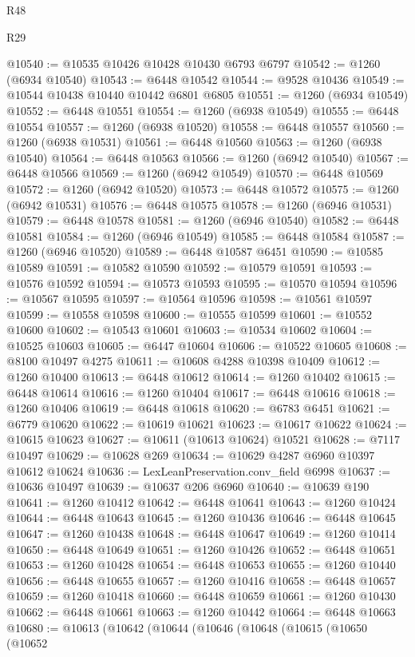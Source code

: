 \begin{lexlean}{R48}
\begin{lexlean}{R29}
\begin{coremodule}
{{{{{{{{{{{{{{{{{{{{{{{{{{{{{{{{{{{{{{{{{{{{{{{{{{{{{{{{{{{{{{{{{{{{{{{{{{{{{{{{{{{{{{{{{{{{{{{{{{{{{{{{{{{{{{{{{{{{{{{{{{{{{{{{{{{{{{{{{{{{{{{{{{{{{{{{{{{{{{{{{{{{{{{{{{{{{{{{{{{{{{{{{{{{{{{{{{{{{{{{{{{{{{{{{{{{{{{{{{@10540 := @10535 @10426 @10428 @10430 @6793 @6797
@10542 := @1260 (@6934 @10540)
@10543 := @6448 @10542
@10544 := @9528 @10436
@10549 := @10544 @10438 @10440 @10442 @6801 @6805
@10551 := @1260 (@6934 @10549)
@10552 := @6448 @10551
@10554 := @1260 (@6938 @10549)
@10555 := @6448 @10554
@10557 := @1260 (@6938 @10520)
@10558 := @6448 @10557
@10560 := @1260 (@6938 @10531)
@10561 := @6448 @10560
@10563 := @1260 (@6938 @10540)
@10564 := @6448 @10563
@10566 := @1260 (@6942 @10540)
@10567 := @6448 @10566
@10569 := @1260 (@6942 @10549)
@10570 := @6448 @10569
@10572 := @1260 (@6942 @10520)
@10573 := @6448 @10572
@10575 := @1260 (@6942 @10531)
@10576 := @6448 @10575
@10578 := @1260 (@6946 @10531)
@10579 := @6448 @10578
@10581 := @1260 (@6946 @10540)
@10582 := @6448 @10581
@10584 := @1260 (@6946 @10549)
@10585 := @6448 @10584
@10587 := @1260 (@6946 @10520)
@10589 := @6448 @10587 @6451
@10590 := @10585 @10589
@10591 := @10582 @10590
@10592 := @10579 @10591
@10593 := @10576 @10592
@10594 := @10573 @10593
@10595 := @10570 @10594
@10596 := @10567 @10595
@10597 := @10564 @10596
@10598 := @10561 @10597
@10599 := @10558 @10598
@10600 := @10555 @10599
@10601 := @10552 @10600
@10602 := @10543 @10601
@10603 := @10534 @10602
@10604 := @10525 @10603
@10605 := @6447 @10604
@10606 := @10522 @10605
@10608 := @8100 @10497 @4275
@10611 := @10608 @4288 @10398 @10409
@10612 := @1260 @10400
@10613 := @6448 @10612
@10614 := @1260 @10402
@10615 := @6448 @10614
@10616 := @1260 @10404
@10617 := @6448 @10616
@10618 := @1260 @10406
@10619 := @6448 @10618
@10620 := @6783 @6451
@10621 := @6779 @10620
@10622 := @10619 @10621
@10623 := @10617 @10622
@10624 := @10615 @10623
@10627 := @10611 (@10613 @10624) @10521
@10628 := @7117 @10497
@10629 := @10628 @269
@10634 := @10629 @4287 @6960 @10397 @10612 @10624
@10636 := LexLeanPreservation.conv_field @6998
@10637 := @10636 @10497
@10639 := @10637 @206 @6960
@10640 := @10639 @190
@10641 := @1260 @10412
@10642 := @6448 @10641
@10643 := @1260 @10424
@10644 := @6448 @10643
@10645 := @1260 @10436
@10646 := @6448 @10645
@10647 := @1260 @10438
@10648 := @6448 @10647
@10649 := @1260 @10414
@10650 := @6448 @10649
@10651 := @1260 @10426
@10652 := @6448 @10651
@10653 := @1260 @10428
@10654 := @6448 @10653
@10655 := @1260 @10440
@10656 := @6448 @10655
@10657 := @1260 @10416
@10658 := @6448 @10657
@10659 := @1260 @10418
@10660 := @6448 @10659
@10661 := @1260 @10430
@10662 := @6448 @10661
@10663 := @1260 @10442
@10664 := @6448 @10663
@10680 := @10613
    (@10642
      (@10644
        (@10646
          (@10648
            (@10615
              (@10650
                (@10652
}}}}}}}}}}}}}}}}}}}}}}}}}}}}}}}}}}}}}}}}}}}}}}}}}}}}}}}}}}}}}}}}}}}}}}}}}}}}}}}}}}}}}}}}}}}}}}}}}}}}}}}}}}}}}}}}}}}}}}}}}}}}}}}}}}}}}}}}}}}}}}}}}}}}}}}}}}}}}}}}}}}}}}}}}}}}}}}}}}}}}}}}}}}}}}}}}}}}}}}}}}}}}}}}}}}}}}}}}}
\end{coremodule}
\end{lexlean}
\end{lexlean}
